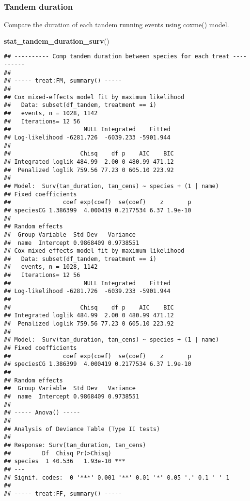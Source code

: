 \documentclass[
]{article}
\newenvironment{Shaded}{\begin{snugshade}}{\end{snugshade}}
\newcommand{\FunctionTok}[1]{\textcolor[rgb]{0.13,0.29,0.53}{\textbf{#1}}}
\newcommand{\NormalTok}[1]{#1}
\begin{document}
\hypertarget{tandem-duration}{%
\subsubsection{Tandem duration}\label{tandem-duration}}

Compare the duration of each tandem running events using coxme() model.

\begin{Shaded}
\begin{Highlighting}[]
\FunctionTok{stat\_tandem\_duration\_surv}\NormalTok{()}
\end{Highlighting}
\end{Shaded}

\begin{verbatim}
## ---------- Comp tandem duration between species for each treat ----------
## 
## ----- treat:FM, summary() -----
## 
## Cox mixed-effects model fit by maximum likelihood
##   Data: subset(df_tandem, treatment == i)
##   events, n = 1028, 1142
##   Iterations= 12 56 
##                     NULL Integrated    Fitted
## Log-likelihood -6281.726  -6039.233 -5901.944
## 
##                    Chisq    df p    AIC    BIC
## Integrated loglik 484.99  2.00 0 480.99 471.12
##  Penalized loglik 759.56 77.23 0 605.10 223.92
## 
## Model:  Surv(tan_duration, tan_cens) ~ species + (1 | name) 
## Fixed coefficients
##               coef exp(coef)  se(coef)    z       p
## speciesCG 1.386399  4.000419 0.2177534 6.37 1.9e-10
## 
## Random effects
##  Group Variable  Std Dev   Variance 
##  name  Intercept 0.9868409 0.9738551
## Cox mixed-effects model fit by maximum likelihood
##   Data: subset(df_tandem, treatment == i)
##   events, n = 1028, 1142
##   Iterations= 12 56 
##                     NULL Integrated    Fitted
## Log-likelihood -6281.726  -6039.233 -5901.944
## 
##                    Chisq    df p    AIC    BIC
## Integrated loglik 484.99  2.00 0 480.99 471.12
##  Penalized loglik 759.56 77.23 0 605.10 223.92
## 
## Model:  Surv(tan_duration, tan_cens) ~ species + (1 | name) 
## Fixed coefficients
##               coef exp(coef)  se(coef)    z       p
## speciesCG 1.386399  4.000419 0.2177534 6.37 1.9e-10
## 
## Random effects
##  Group Variable  Std Dev   Variance 
##  name  Intercept 0.9868409 0.9738551
## 
## ----- Anova() -----
## 
## Analysis of Deviance Table (Type II tests)
## 
## Response: Surv(tan_duration, tan_cens)
##         Df  Chisq Pr(>Chisq)    
## species  1 40.536   1.93e-10 ***
## ---
## Signif. codes:  0 '***' 0.001 '**' 0.01 '*' 0.05 '.' 0.1 ' ' 1
## 
## ----- treat:FF, summary() -----

\end{verbatim}
\end{document}

